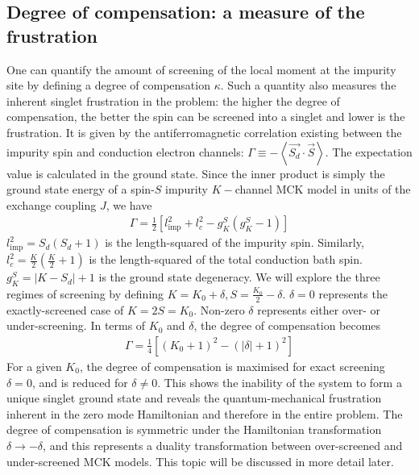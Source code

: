 \documentclass[reprint,prb,superscriptaddress]{revtex4-1}
\begin{document}
\subsection{Degree of compensation: a measure of the frustration}
\label{sec:deg_of_comp}
One can quantify the amount of screening of the local moment at the impurity site by defining a degree of compensation \(\kappa\). Such a quantity also measures the inherent singlet frustration in the problem: the higher the degree of compensation, the better the spin can be screened into a singlet and lower is the frustration. It is given by the antiferromagnetic correlation existing between the impurity spin and conduction electron channels: $\Gamma \equiv - \left< \vec{S_d}\cdot \vec{S}\right>$.
The expectation value is calculated in the ground state. Since the inner product is simply the ground state energy of a spin-\(S\) impurity \(K-\)channel MCK model in units of the exchange coupling \(J\), we have
\begin{equation}\begin{aligned}
	\Gamma = \frac{1}{2} \left[ l_\text{imp}^2 + l_c^2 - g^S_K\left( g^S_K - 1 \right)\right]
\end{aligned}\end{equation}
\(l_\text{imp}^2 = S_d(S_d+1)\) is the length-squared of the impurity spin. Similarly, \(l_c^2 = \frac{K}{2}\left(\frac{K}{2} + 1\right) \) is the length-squared of the total conduction bath spin. \(g^S_K = |K - S_d| + 1\) is the ground state degeneracy. We will explore the three regimes of screening by defining \(K = K_0 + \delta, S = \frac{K_0}{2} - \delta\). \(\delta=0\) represents the exactly-screened case of \(K = 2S = K_0\). Non-zero \(\delta\) represents either over- or under-screening. In terms of \(K_0\) and \(\delta\), the degree of compensation becomes
\begin{equation}\begin{aligned}
	\label{gamma}
	\Gamma = \frac{1}{4}\left[\left( K_0 + 1 \right) ^2 - \left(|\delta| + 1 \right) ^2\right] 
\end{aligned}\end{equation}
{For a given \(K_0\), the degree of compensation is maximised for exact screening \(\delta=0\), and is reduced for \(\delta \neq 0\). This shows the inability of the system to form a unique singlet ground state and reveals the quantum-mechanical frustration inherent in the zero mode Hamiltonian and therefore in the entire problem.} The degree of compensation is symmetric under the Hamiltonian transformation \(\delta \to -\delta\), and this represents a duality transformation between over-screened and under-screened MCK models. This topic will be discussed in more detail later.
\end{document}
